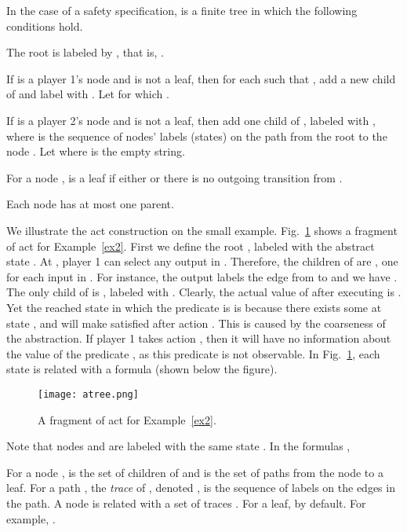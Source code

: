 \documentclass[letterpaper, 10 pt, conference]{ieeeconf}
\begin{document}
In the case of a safety specification,  is a
finite tree in which the following conditions hold. 
\begin{inparaenum}[1)]
\item The root  is labeled by , that is, .
\item If  is a player 1's node and  is not a leaf, then for
  each  such that , add a new child  of 
  and label  with . Let  for which
  .
\item If  is a player 2's node and  is not a leaf, then
  add one child  of , labeled with , where
   is the sequence of nodes' labels (states) on the path from
  the root to the node . Let  where
   is the empty string. \item For a node ,  is a leaf if either  or there is no outgoing transition from .
\item Each node has at most one parent.
\end{inparaenum} 




We illustrate the \ac{act} construction on the small
example. Fig.~\ref{ex:act} shows a fragment of \ac{act} for
Example~\ref{ex2}.  First we define the root , labeled with the
abstract state . At ,
player 1 can select any output in .  Therefore, the children
of  are , one for each input in .  For instance,
the output  labels the edge from  to  and we have
. The only child of  is , labeled with .  Clearly, the actual value of  after executing
 is . Yet the reached state  in which the
predicate  is  is because there exists some  at state , and will make  satisfied after
action . This is caused by the coarseness of the
abstraction.  If player 1 takes action , then it will have
no information about the value of the predicate , as this
predicate is not observable. In Fig.~\ref{ex:act}, each state  is related with a formula  (shown below the figure).
\vspace{-2ex}
\begin{figure}[H]
\centering
\texttt{[image: atree.png]}
\caption{A fragment of \ac{act} for Example~\ref{ex2}. }
\label{ex:act}
\end{figure}
\vspace{-2ex}
Note that nodes
   and  are labeled with the same state . In the formulas
  , 




For a node ,  is the set of children of 
and  is the set of paths
from the node  to a leaf.  For a path ,
the \emph{trace} of , denoted , is the sequence of labels on the edges in the path.  A
node  is related with a set of traces
. For a leaf,  by
default. For example, .
\end{document}
